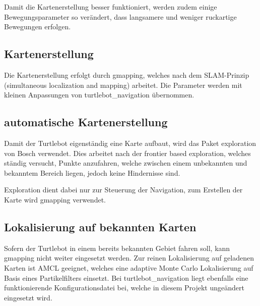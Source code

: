 Damit die Kartenerstellung besser funktioniert, werden zudem einige Bewegungsparameter so verändert, dass langsamere und weniger ruckartige Bewegungen erfolgen.

\subsection{Kartenerstellung}
Die Kartenerstellung erfolgt durch gmapping, welches nach dem SLAM-Prinzip (simultaneous localization and mapping) arbeitet. Die Parameter werden mit kleinen Anpassungen von turtlebot\_navigation übernommen.

\subsection{automatische Kartenerstellung}
Damit der Turtlebot eigenständig eine Karte aufbaut, wird das Paket exploration von Bosch verwendet. Dies arbeitet nach der frontier based exploration, welches ständig versucht, Punkte anzufahren, welche zwischen einem unbekannten und bekanntem Bereich liegen, jedoch keine Hindernisse sind.

Exploration dient dabei nur zur Steuerung der Navigation, zum Erstellen der Karte wird gmapping verwendet.

\subsection{Lokalisierung auf bekannten Karten}
Sofern der Turtlebot in einem bereits bekannten Gebiet fahren soll, kann gmapping nicht weiter eingesetzt werden. Zur reinen Lokalisierung auf geladenen Karten ist AMCL geeignet, welches eine adaptive Monte Carlo Lokalisierung auf Basis eines Partikelfilters einsetzt. Bei turtlebot\_navigation liegt ebenfalls eine funktionierende Konfigurationsdatei bei, welche in diesem Projekt ungeändert eingesetzt wird.




